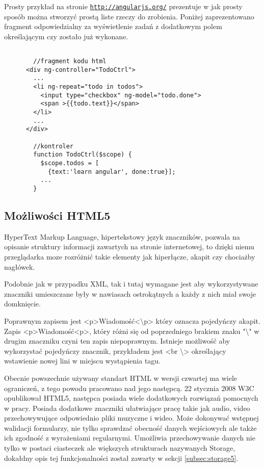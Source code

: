 Prosty przykład na stronie \underline{\texttt{http://angularjs.org/}} prezentuje w jak prosty sposób można stworzyć prostą liste rzeczy do zrobienia. Poniżej zaprezentowano fragment odpowiedzialny za wyświetlenie zadań z dodatkowym polem określającym czy zostało już wykonane.

\lstset{language=JavaScript}
\begin{lstlisting}[caption=AngularJs]

        //fragment kodu html
      <div ng-controller="TodoCtrl">
        ...
        <li ng-repeat="todo in todos">
          <input type="checkbox" ng-model="todo.done">
          <span >{{todo.text}}</span>
        </li>
        ...
      </div>

        //kontroler
        function TodoCtrl($scope) {
          $scope.todos = [
            {text:'learn angular', done:true}];
          ...
        }
\end{lstlisting}

\subsection{Możliwości HTML5}
\label{sec:html5}
\nocite{xml50}
\nocite{proxml}
\nocite{pre1}
\nocite{pre2}
\nocite{googlemapsbegin}
\nocite{proHTML5}
HyperText Markup Language, hipertekstowy język znaczników, pozwala na opisanie struktury informacji zawartych na stronie internetowej, to dzięki niemu przeglądarka moze rozróżnić takie elementy jak hiperłącze, akapit czy chociażby nagłówek.

Podobnie jak w przypadku XML, tak i tutaj wymagane jest aby wykorzystywane znaczniki umieszczane były w nawiasach ostrokątnych a każdy z nich miał swoje domknięcie.

Poprawnym zapisem jest <p>Wiadomość<\textbackslash p> który oznacza pojedyńczy akapit. Zapis <p>Wiadomość<p>, który różni się od poprzedniego brakiem znaku "\textbackslash" w drugim znaczniku czyni ten zapis niepoprawnym. Istnieje możliwość aby wykorzystać pojedyńczy znacznik, przykładem jest <br \textbackslash> określający wstawienie nowej lini w miejscu wystąpienia tagu.

Obecnie powszechnie używany standart HTML w wersji czwartej ma wiele ograniczeń, z tego powodu pracowano nad jego następcą. 22 stycznia 2008 W3C opublikował HTML5, następca posiada wiele dodatkowych rozwiązań pomocnych w pracy. Posiada dodatkowe znaczniki ułatwiające pracę takie jak audio, video przechowywujące odpowiednio pliki muzyczne i wideo. Może dokonywać wstępnej walidacji formularzy, nie tylko sprawdzać obecność danych wejściowych ale także ich zgodność z wyrażeniami regularnymi. Umożliwia przechowywanie danych nie tylko w postaci ciasteczek ale większych strukturach nazywanych Storage, dokałdny opis tej funkcjonalności został zawarty w sekcji  \ref{subsec:storage5}.


